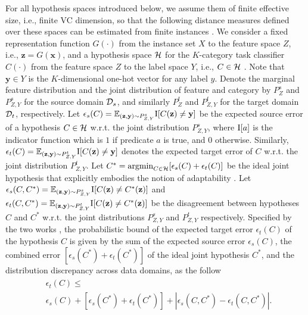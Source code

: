 \documentclass[letterpaper]{article} \usepackage{aaai20}  \usepackage{times}  \usepackage{helvet} \usepackage{courier}  \usepackage[hyphens]{url}  \usepackage{graphicx} \urlstyle{rm} \def\UrlFont{\rm}  \usepackage{graphicx}  \frenchspacing  \setlength{\pdfpagewidth}{8.5in}  \setlength{\pdfpageheight}{11in}
\begin{document}
For all hypothesis spaces introduced below, we assume them of finite effective size, i.e., finite VC dimension, so that the following distance measures defined over these spaces can be estimated from finite instances \cite{da_theory2}. 
We consider a fixed representation function $G(\cdot)$ from the instance set $X$ to the feature space $Z$, i.e., $\mathbf{z} = G(\mathbf{x})$, and a hypothesis space $\cal{H}$ for the $K$-category task classifier $C(\cdot)$ from the feature space $Z$ to the label space $Y$, i.e., $C \in \cal{H}$ \cite{dann}. Note that $\mathbf{y} \in Y$ is the $K$-dimensional one-hot vector for any label $y$. Denote the marginal feature distribution and the joint distribution of feature and category by $P_{Z}^s$ and $P_{Z, Y}^s$ for the source domain ${\cal{D}}_s$, and similarly $P_{Z}^t$ and $P_{Z, Y}^t$ for the target domain ${\cal{D}}_t$, respectively. Let $\epsilon_s(C) = \mathbb{E}_{(\mathbf{z}, \mathbf{y}) \sim P_{Z, Y}^s} {\rm I}[C(\mathbf{z}) \ne \mathbf{y}]$ be the expected source error of a hypothesis $C \in \cal{H}$ w.r.t. the joint distribution $P_{Z, Y}^s$, where ${\rm I}[a]$ is the indicator function which is $1$ if predicate $a$ is true, and $0$ otherwise. Similarly, $\epsilon_t(C) = \mathbb{E}_{(\mathbf{z}, \mathbf{y}) \sim P_{Z, Y}^t} {\rm I}[C(\mathbf{z}) \ne \mathbf{y}]$ denotes the expected target error of $C$ w.r.t. the joint distribution $P_{Z, Y}^t$. Let $C^* = {\rm argmin}_{C \in \cal{H}}[\epsilon_s(C)+\epsilon_t(C)]$ be the ideal joint hypothesis that explicitly embodies the notion of adaptability \cite{da_theory2}. Let $\epsilon_s(C, C^*) = \mathbb{E}_{(\mathbf{z}, \mathbf{y}) \sim P_{Z, Y}^s} {\rm I} [C(\mathbf{z}) \ne C^*(\mathbf{z})]$ and $\epsilon_t(C, C^*) = \mathbb{E}_{(\mathbf{z}, \mathbf{y}) \sim P_{Z, Y}^t} {\rm I} [C(\mathbf{z}) \ne C^*(\mathbf{z})]$ be the disagreement between hypotheses $C$ and $C^*$ w.r.t. the joint distributions $P_{Z, Y}^s$ and $P_{Z, Y}^t$ respectively. Specified by the two works \cite{da_theory1,da_theory2}, the probabilistic bound of the expected target error $\epsilon_t(C)$ of the hypothesis $C$ is given by the sum of the expected source error $\epsilon_s(C)$, the combined error $[\epsilon_s(C^*) + \epsilon_t(C^*)]$ of the ideal joint hypothesis $C^*$, and the distribution discrepancy across data domains, as the follow
\begin{eqnarray}\label{EqnExpTarErrBound}
\begin{aligned}
&\epsilon_t(C) \le \\ 
&\epsilon_s(C) + [\epsilon_s(C^*) + \epsilon_t(C^*)] + |\epsilon_s(C, C^*) - \epsilon_t(C, C^*)|. 
\end{aligned}
\end{eqnarray}
\end{document}
